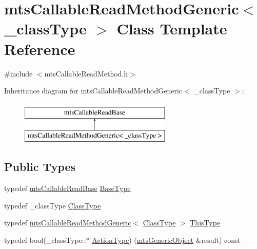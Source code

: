 \hypertarget{classmts_callable_read_method_generic}{}\section{mts\+Callable\+Read\+Method\+Generic$<$ \+\_\+class\+Type $>$ Class Template Reference}
\label{classmts_callable_read_method_generic}


{\ttfamily \#include $<$mts\+Callable\+Read\+Method.\+h$>$}

Inheritance diagram for mts\+Callable\+Read\+Method\+Generic$<$ \+\_\+class\+Type $>$\+:\begin{figure}[H]
\begin{center}
\leavevmode
\includegraphics[height=2.000000cm]{d1/dd3/classmts_callable_read_method_generic}
\end{center}
\end{figure}
\subsection*{Public Types}
\begin{DoxyCompactItemize}
\item 
typedef \hyperlink{classmts_callable_read_base}{mts\+Callable\+Read\+Base} \hyperlink{classmts_callable_read_method_generic_ade696274218351d03e90dd1d7609d575}{Base\+Type}
\item 
typedef \+\_\+class\+Type \hyperlink{classmts_callable_read_method_generic_afa0ef401d0f5538af2f0fe114ad9202d}{Class\+Type}
\item 
typedef \hyperlink{classmts_callable_read_method_generic}{mts\+Callable\+Read\+Method\+Generic}$<$ \hyperlink{classmts_callable_read_method_generic_afa0ef401d0f5538af2f0fe114ad9202d}{Class\+Type} $>$ \hyperlink{classmts_callable_read_method_generic_a4fa11906c9156401ae37307545a10f80}{This\+Type}
\item 
typedef bool(\+\_\+class\+Type\+::$\ast$ \hyperlink{classmts_callable_read_method_generic_a0f8662a2b477512a0cfa147cc8faa555}{Action\+Type}) (\hyperlink{classmts_generic_object}{mts\+Generic\+Object} \&result) const 
\end{DoxyCompactItemize}
